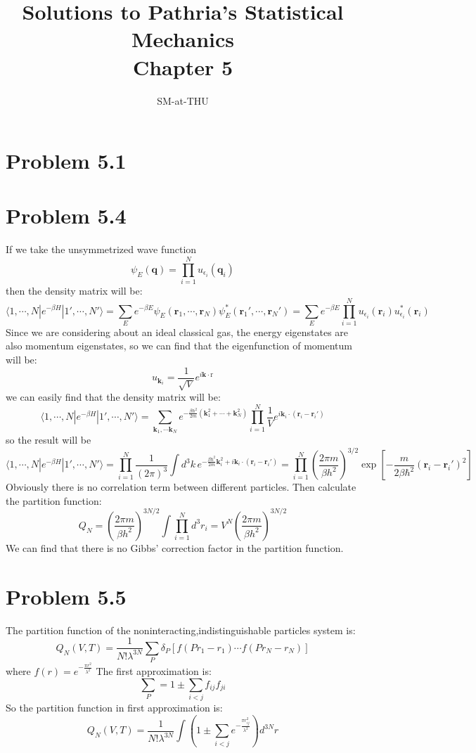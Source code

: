 \documentclass{article}
\author{SM-at-THU}
\title{\bf{Solutions to Pathria's Statistical Mechanics}\\Chapter 5}
\begin{document}
\maketitle
\section*{Problem 5.1}

\section*{Problem 5.4}
If we take the unsymmetrized wave function
$$
\psi_E(\mathbf{q}) = \prod_{i=1}^N u_{\epsilon_i}(\mathbf{q}_i)
$$
then the density matrix will be:
\begin{equation}
\langle 1,\cdots,N|e^{-\beta H}|1',\cdots,N'\rangle = \sum_{E}e^{-\beta E}\psi_E(\mathbf{r}_1,\cdots,\mathbf{r}_N)\psi^*_E(\mathbf{r}_1',\cdots,\mathbf{r}_N')=\sum_{E}e^{-\beta E}\prod_{i=1}^N u_{\epsilon_i}(\mathbf{r}_i)u^*_{\epsilon_i}(\mathbf{r}_i)
\end{equation}
Since we are considering about an ideal classical gas, the energy eigenstates are also momentum eigenstates, so we can find that the eigenfunction of momentum will be:
$$
u_{\mathbf{k}_i} = \frac{1}{\sqrt{V}}e^{i\mathbf{k}\cdot\mathrm{r}}
$$
we can easily find that the density matrix will be:
\begin{equation}
\langle 1,\cdots,N|e^{-\beta H}|1',\cdots,N'\rangle = \sum_{\mathbf{k}_1,\cdots \mathbf{k}_N}e^{-\frac{\beta \hbar^2}{2m}(\mathbf{k}^2_1+\cdots+\mathbf{k}_N^2)}\prod_{i=1}^N\frac{1}{V}e^{i\mathbf{k}_i\cdot(\mathbf{r}_i-\mathbf{r}_i')}
\end{equation}
so the result will be
\begin{equation}
\langle 1,\cdots,N|e^{-\beta H}|1',\cdots,N'\rangle = \prod_{i=1}^N\frac{1}{(2\pi)^3}\int d^3k \,e^{-\frac{\beta \hbar^2}{2m}\mathbf{k}_i^2+i\mathbf{k}_i\cdot(\mathbf{r}_i-\mathbf{r}_i')} = \prod_{i=1}^N\left(\frac{2\pi m}{\beta h^2}\right)^{3/2}\exp\left[-\frac{m}{2\beta\hbar^2}(\mathbf{r}_i-\mathbf{r}_i')^2\right]
\end{equation}
Obviously there is no correlation term between different particles. Then calculate the partition function:
\begin{equation}
Q_N = \left(\frac{2\pi m}{\beta h^2}\right)^{3N/2}\int \prod_{i=1}^N d^3r_i = V^N \left(\frac{2\pi m}{\beta h^2}\right)^{3N/2}
\end{equation}
We can find that there is no Gibbs’ correction factor in the partition function.


\section*{Problem 5.5} %
\label{sec:problem_5_5}
	
	The partition function of the noninteracting,indistinguishable particles system is:
	$$Q_N(V,T)=\frac{1}{N!\lambda^{3N}}\sum_P \delta_P[f(Pr_1-r_1)\cdots f(Pr_N-r_N)]$$
	where $f(r)=e^{-\frac{\pi r^2}{\lambda^2}}$
	The first approximation is:
	$$\sum_P=1\pm\sum_{i<j}f_{ij}f_{ji}$$
	So the partition function in first approximation is:
	$$Q_N(V,T)=\frac{1}{N!\lambda^{3N}}\int(1\pm\sum_{i<j}e^{-\frac{\pi r_{ij}^2}{\lambda^2}})d^{3N}r$$
\end{document}
